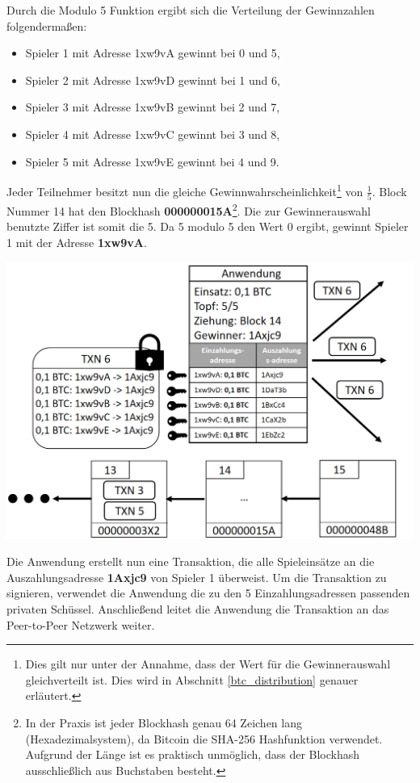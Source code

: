 \noindent Durch die Modulo 5 Funktion ergibt sich die Verteilung der Gewinnzahlen folgendermaßen:
\begin{itemize}
\item Spieler 1 mit Adresse 1xw9vA gewinnt bei 0 und 5,
\item Spieler 2 mit Adresse 1xw9vD gewinnt bei 1 und 6,
\item Spieler 3 mit Adresse 1xw9vB gewinnt bei 2 und 7,
\item Spieler 4 mit Adresse 1xw9vC gewinnt bei 3 und 8,
\item Spieler 5 mit Adresse 1xw9vE gewinnt bei 4 und 9.
\end{itemize}
Jeder Teilnehmer besitzt nun die gleiche Gewinnwahrscheinlichkeit\footnote{Dies gilt nur unter der Annahme, dass der Wert für die Gewinnerauswahl gleichverteilt ist. Dies wird in Abschnitt \ref{btc_distribution} genauer erläutert.} von $\frac{1}{5}$. Block Nummer 14 hat den Blockhash \textbf{000000015A}\footnote{In der Praxis ist jeder Blockhash genau 64 Zeichen lang (Hexadezimalsystem), da Bitcoin die SHA-256 Hashfunktion verwendet. Aufgrund der Länge ist es praktisch unmöglich, dass der Blockhash ausschließlich aus Buchstaben besteht.}. Die zur Gewinnerauswahl benutzte Ziffer ist somit die 5. Da 5 modulo 5 den Wert 0 ergibt, gewinnt Spieler 1 mit der Adresse \textbf{1xw9vA}.

\vspace{1cm}
\begin{minipage}{0.55\textwidth}
\includegraphics[width=\textwidth]{Figures/konzept_btc/konzept11}
\centering
\decoRule
{}
\label{fig:konzept11}
\end{minipage}
\begin{minipage}{0.45\textwidth}
Die Anwendung erstellt nun eine Transaktion, die alle Spieleinsätze an die Auszahlungsadresse \textbf{1Axjc9} von Spieler 1 überweist. Um die Transaktion zu signieren, verwendet die Anwendung die zu den 5 Einzahlungsadressen passenden privaten Schüssel. Anschließend leitet die Anwendung die Transaktion an das Peer-to-Peer Netzwerk weiter.
\end{minipage}

